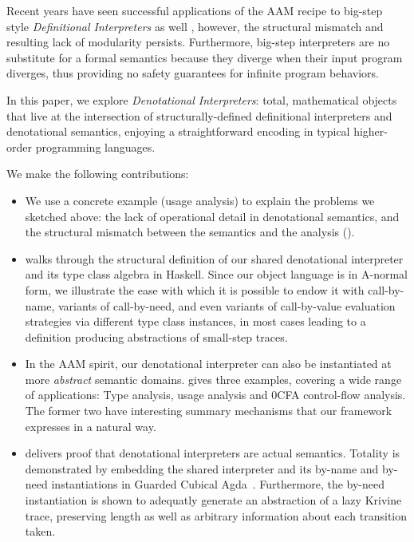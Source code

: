 Recent years have seen successful applications of the AAM recipe to big-step
style \emph{Definitional Interpreters} as well \cite{Reynolds:72,adi,Keidel:18},
however, the structural mismatch and resulting lack of modularity persists.
Furthermore, big-step interpreters are no substitute for a formal semantics
because they diverge when their input program diverges, thus providing no
safety guarantees for infinite program behaviors.

In this paper, we explore \emph{Denotational Interpreters}:
total, mathematical objects that live at the intersection of
structurally-defined definitional interpreters and denotational semantics,
enjoying a straightforward encoding in typical higher-order programming
languages.

We make the following contributions:
\begin{itemize}
\item {}
  We use a concrete example (usage analysis) to explain the problems we sketched
  above: the lack of operational detail in denotational semantics, and the structural mismatch
  between the semantics and the analysis ().
\item {} walks through the structural definition of our shared
  denotational interpreter and its type class algebra in Haskell.
  Since our object language is in A-normal form, we illustrate the ease with
  which it is possible to endow it with call-by-name, variants of call-by-need,
  and even variants of call-by-value evaluation strategies via different type
  class instances, in most cases leading to a definition producing abstractions
  of small-step traces.
\item In the AAM spirit, our denotational interpreter can also be
  instantiated at more \emph{abstract} semantic domains.
   gives three examples, covering a wide range of
  applications: Type analysis, usage analysis and 0CFA control-flow analysis.
  The former two have interesting summary mechanisms that our framework
  expresses in a natural way.
\item {} delivers proof that denotational
  interpreters are actual semantics.
  Totality is demonstrated by embedding the shared interpreter and its by-name
  and by-need instantiations in Guarded Cubical Agda~\citep{tctt}.
  Furthermore, the by-need instantiation is shown to adequatly generate an
  abstraction of a lazy Krivine trace, preserving length as well as arbitrary
  information about each transition taken.

\end{itemize}
